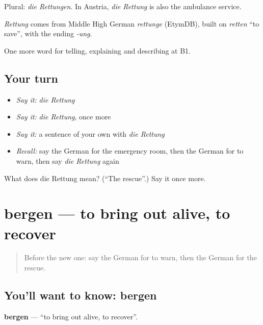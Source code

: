 Plural: \emph{die Rettungen}. In Austria, \emph{die Rettung} is also the ambulance service.

\begin{cousinweb}
\emph{Rettung} comes from Middle High German \emph{rettunge} (EtymDB), built on \emph{retten} \textquotedblleft{}to save\textquotedblright{}, with the ending \emph{-ung}.
\end{cousinweb}

\begin{grammarlens}[title={What you've built}]
One more word for telling, explaining and describing at B1.
\end{grammarlens}

\subsection*{Your turn}
\begin{itemize}
\raggedright
  \item \emph{Say it:} \emph{die Rettung}
  \item \emph{Say it:} \emph{die Rettung}, once more
  \item \emph{Say it:} a sentence of your own with \emph{die Rettung}
  \item \emph{Recall:} say the German for the emergency room, then the German for to warn, then say \emph{die Rettung} again
\end{itemize}

\begin{tcolorbox}[breakable,colback=teal!4,colframe=teal!35!black,title={Before you move on}]
What does die Rettung mean? (\textquotedblleft{}The rescue\textquotedblright{}.) Say it once more.
\end{tcolorbox}
\section[bergen]{bergen — to bring out alive, to recover}

\label{lesson:GE-C292-bergen}



\begin{quote}
Before the new one: say the German for to warn, then the German for the rescue.
\end{quote}

\subsection*{You'll want to know: bergen}
\textbf{bergen} — \textquotedblleft{}to bring out alive, to recover\textquotedblright{}.

